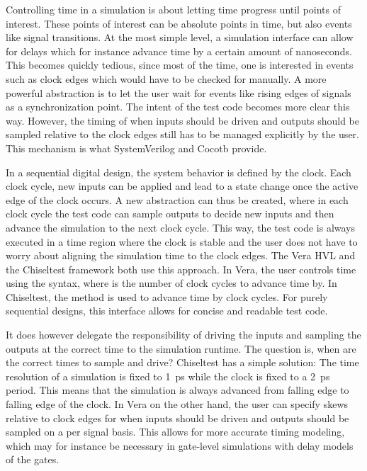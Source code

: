 Controlling time in a simulation is about letting time progress until points of interest. These points of interest can
be absolute points in time, but also events like signal transitions. At the most simple level, a simulation interface
can allow for delays which for instance advance time by a certain amount of nanoseconds. This becomes quickly
tedious, since most of the time, one is interested in events such as clock edges which would have to be checked for
manually. A more powerful abstraction is to let the user wait for events like rising edges of signals as a
synchronization point. The intent of the test code becomes more clear this way. However, the timing of when inputs
should be driven and outputs should be sampled relative to the clock edges still has to be managed explicitly by the
user. This mechanism is what SystemVerilog and Cocotb provide.

In a sequential digital design, the system behavior is defined by the clock. Each clock cycle, new inputs can be
applied and lead to a state change once the active edge of the clock occurs. A new abstraction can thus be created,
where in each clock cycle the test code can sample outputs to decide new inputs and then advance the simulation to
the next clock cycle. This way, the test code is always executed in a time region where the clock is stable and the
user does not have to worry about aligning the simulation time to the clock edges. The Vera \cite[Sec. 7]{flake2020a}
HVL and the Chiseltest \cite{chiseltest} framework both use this approach. In Vera, the user controls time using the
 syntax, where  is the number of clock cycles to advance time by. In Chiseltest, the
 method is used to advance time by  clock cycles. For purely sequential designs, this
interface allows for concise and readable test code.

It does however delegate the responsibility of driving the inputs and sampling the outputs at the correct time to the simulation
runtime. The question is, when are the correct times to sample and
drive? Chiseltest has a simple solution: The time resolution of a simulation is fixed to \SI{1}{ps} while the clock
is fixed to a \SI{2}{ps} period. This means that the simulation is always advanced from falling edge to falling edge
of the clock. In Vera on the other hand, the user can specify skews relative to clock edges for when inputs should be
driven and outputs should be sampled on a per signal basis. This allows for more accurate timing modeling, which may
for instance be necessary in gate-level simulations with delay models of the gates.

